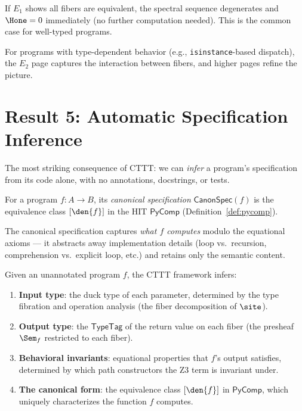 If $E_1$ shows all fibers are equivalent, the spectral sequence
degenerates and $\Hone = 0$ immediately (no further computation
needed).  This is the common case for well-typed programs.

For programs with type-dependent behavior (e.g.,
\texttt{isinstance}-based dispatch), the $E_2$ page captures the
interaction between fibers, and higher pages refine the picture.


\section{Result 5: Automatic Specification Inference}

The most striking consequence of CTTT: we can \emph{infer} a
program's specification from its code alone, with no annotations,
docstrings, or tests.

\begin{definition}
For a program $f : A \to B$, its \emph{canonical specification}
$\mathsf{CanonSpec}(f)$ is the equivalence class $[\den{f}]$ in the
HIT $\mathsf{PyComp}$ (Definition~\ref{def:pycomp}).
\end{definition}

The canonical specification captures \emph{what $f$ computes} modulo
the equational axioms --- it abstracts away implementation details
(loop vs.\ recursion, comprehension vs.\ explicit loop, etc.) and
retains only the semantic content.

\begin{theorem}
\label{thm:spec-inference}
Given an unannotated program $f$, the CTTT framework infers:
\begin{enumerate}
  \item \textbf{Input type}: the duck type of each parameter,
    determined by the type fibration and operation analysis
    (the fiber decomposition of $\site$).
  \item \textbf{Output type}: the $\mathsf{TypeTag}$ of the return
    value on each fiber (the presheaf $\Sem_f$ restricted to each
    fiber).
  \item \textbf{Behavioral invariants}: equational properties that
    $f$'s output satisfies, determined by which path constructors
    the Z3 term is invariant under.
  \item \textbf{The canonical form}: the equivalence class
    $[\den{f}]$ in $\mathsf{PyComp}$, which uniquely characterizes
    the function $f$ computes.
\end{enumerate}
\end{theorem}

